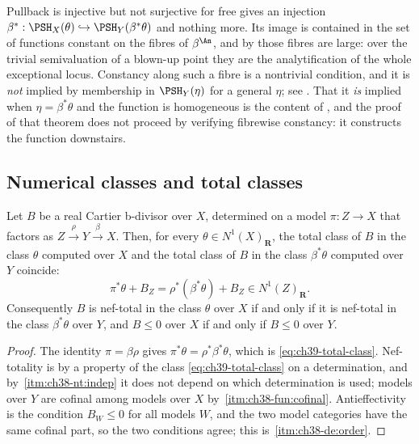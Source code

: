 \begin{warning}{Pullback is injective but not surjective for free}
\label{warn:ch39-pullback-not-onto}
 gives an injection
$\beta^*:\PSH_X(\theta)\hookrightarrow\PSH_Y(\beta^*\theta)$ and nothing
more.  Its image is contained in the set of functions constant on the fibres
of $\beta^{\An}$, and by  those fibres are large:
over the trivial semivaluation of a blown-up point they are the
analytification of the whole exceptional locus.  Constancy along such a
fibre is a nontrivial condition, and it is \emph{not} implied by
membership in $\PSH_Y(\eta)$ for a general $\eta$; see
.  That it \emph{is} implied when
$\eta=\beta^*\theta$ and the function is homogeneous is the content of
, and the proof of that theorem does not
proceed by verifying fibrewise constancy: it constructs the function
downstairs.
\end{warning}

\subsection{Numerical classes and total classes}
\label{sec:ch39-classes}

\begin{lemma}
\label{lem:ch39-total-class}
Let $B$ be a real Cartier b-divisor over $X$, determined on a model
$\pi:Z\to X$ that factors as $Z\xrightarrow{\ \rho\ }Y
\xrightarrow{\ \beta\ }X$.  Then, for every
$\theta\in N^1(X)_{\mathbf R}$, the total class of $B$ in the class
$\theta$ computed over $X$ and the total class of $B$ in the class
$\beta^*\theta$ computed over $Y$ coincide:
\[
 \pi^*\theta+B_Z=\rho^*(\beta^*\theta)+B_Z\in N^1(Z)_{\mathbf R}.
\tag{39.5}\label{eq:ch39-total-class}
\]
Consequently $B$ is nef-total in the class $\theta$ over $X$ if and
only if it is nef-total in the class $\beta^*\theta$ over $Y$, and
$B\le0$ over $X$ if and only if $B\le0$ over $Y$.
\end{lemma}

\begin{proof}
The identity $\pi=\beta\rho$ gives $\pi^*\theta=\rho^*\beta^*\theta$,
which is \eqref{eq:ch39-total-class}.  Nef-totality is by
 a property of the class
\eqref{eq:ch39-total-class} on a determination, and by
\,\cref{itm:ch38-nt:indep} it does not
depend on which determination is used; models over $Y$ are cofinal among
models over $X$ by
\,\cref{itm:ch38-fun:cofinal}.
Antieffectivity is the condition $B_W\le0$ for all models $W$, and the
two model categories have the same cofinal part, so the two conditions
agree; this is
\,\cref{itm:ch38-de:order}.
\end{proof}

